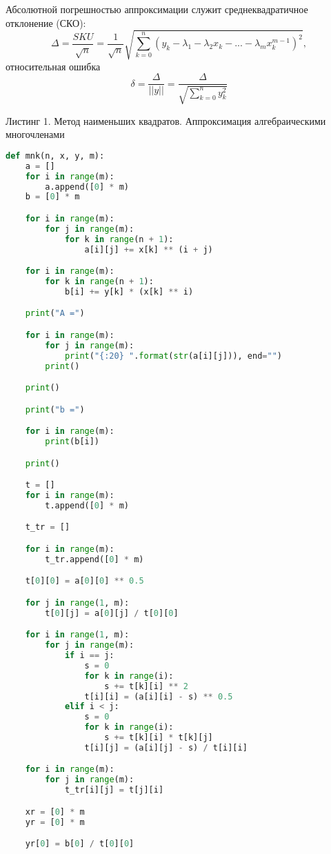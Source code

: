 \documentclass [12pt]{article}
\begin{document}
Абсолютной погрешностью аппроксимации служит среднеквадратичное отклонение (СКО): $$ \Delta = \frac{SKU}{\sqrt{n}} = \frac{1}{\sqrt{n}}\sqrt{\sum\limits_{k = 0}^n{(y_k - \lambda_{1} - \lambda_{2}x_k - ... -\lambda_{m}x_{k}^{m-1})^2}},$$
относительная ошибка $$ \delta = \frac{\Delta}{||y||} = \frac{\Delta}{\sqrt{\sum\limits_{k = 0}^n{y_{k}^2}}} $$

Листинг 1. Метод наименьших квадратов. Аппроксимация алгебраическими многочленами

\begin{lstlisting}[language=python]
def mnk(n, x, y, m):
    a = []
    for i in range(m):
        a.append([0] * m)
    b = [0] * m

    for i in range(m):
        for j in range(m):
            for k in range(n + 1):
                a[i][j] += x[k] ** (i + j)

    for i in range(m):
        for k in range(n + 1):
            b[i] += y[k] * (x[k] ** i)

    print("A =")

    for i in range(m):
        for j in range(m):
            print("{:20} ".format(str(a[i][j])), end="")
        print()

    print()

    print("b =")

    for i in range(m):
        print(b[i])

    print()

    t = []
    for i in range(m):
        t.append([0] * m)

    t_tr = []

    for i in range(m):
        t_tr.append([0] * m)

    t[0][0] = a[0][0] ** 0.5

    for j in range(1, m):
        t[0][j] = a[0][j] / t[0][0]

    for i in range(1, m):
        for j in range(m):
            if i == j:
                s = 0
                for k in range(i):
                    s += t[k][i] ** 2
                t[i][i] = (a[i][i] - s) ** 0.5
            elif i < j:
                s = 0
                for k in range(i):
                    s += t[k][i] * t[k][j]
                t[i][j] = (a[i][j] - s) / t[i][i]

    for i in range(m):
        for j in range(m):
            t_tr[i][j] = t[j][i]

    xr = [0] * m
    yr = [0] * m

    yr[0] = b[0] / t[0][0]


\end{lstlisting}
\end{document}

